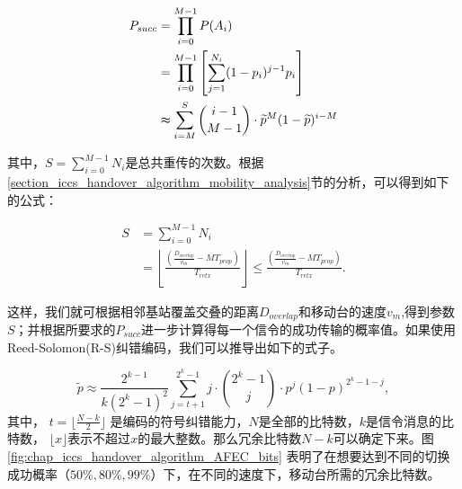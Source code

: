 \begin{align}
\notag P_{succ} &= \prod_{i=0}^{M-1}P(A_{i})\\
&= \prod_{i=0}^{M-1}\left[\sum_{j=1}^{N_{i}}(1-p_{i})^{j-1}p_{i}\right]\\
\notag &\thickapprox\sum_{i=M}^{S}{i-1 \choose M-1}\cdot\widetilde{p}^{M}(1-\widetilde{p})^{i-M}
\end{align}

其中，$S=\sum_{i=0}^{M-1}N_{i}$是总共重传的次数。根据\ref{section_iccs_handover_algorithm_mobility_analysis}节的分析，可以得到如下的公式：

\begin{align*}
S & = \sum_{i=0}^{M-1}N_{i}\\
  & = \left\lfloor \frac{(\frac{D_{overlap}}{v_{m}}-MT_{prop})}
        {T_{retx}}\right\rfloor \leq\frac{(\frac{D_{overlap}}{v_{m}}
        -MT_{prop})}{T_{retx}}.
\end{align*}

这样，我们就可根据相邻基站覆盖交叠的距离$D_{overlap}$和移动台的速度$v_m$,得到参数$S$；并根据所要求的$P_{succ}$进一步计算得每一个信令的成功传输的概率值。如果使用Reed-Solomon(R-S)纠错编码，我们可以推导出如下的式子。

\begin{equation}\label{eq:chap_iccs_handover_algorithm_FEC_Pro_final}
\tilde{p}\approx\frac{2^{k-1}}{k(2^{k}-1)^{2}}\sum_{j=t+1}^{2^{k}-1}j
\cdot{2^{k}-1\choose j}_{}^{}\cdot p^{j}(1-p)^{2^{k}-1-j},
\end{equation}
其中， $t=\lfloor\frac{N-k}{2}\rfloor$ 是编码的符号纠错能力，$N$是全部的比特数，$k$是信令消息的比特数， $\lfloor{x}\rfloor$表示不超过$x$的最大整数。那么冗余比特数$N-k$可以确定下来。图 \ref{fig:chap_iccs_handover_algorithm_AFEC_bits} 表明了在想要达到不同的切换成功概率（$50\%,80\%,99\%$）下，在不同的速度下，移动台所需的冗余比特数。

